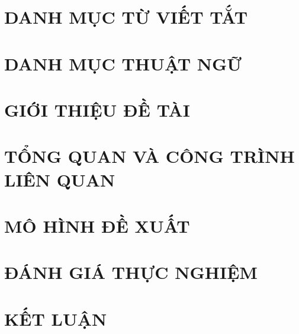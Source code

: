 \documentclass[a4paper,twoside]{report}
\theoremstyle{definition}
\numberwithin{equation}{chapter}
\begin{document}
\newpage
{}
{}
\chapter*{DANH MỤC TỪ VIẾT TẮT}


\newpage
{}
{}
\chapter*{DANH MỤC THUẬT NGỮ}



\newpage
{}

\pagestyle{fancy}
\fancyhf{}
\fancyhead[RE, LO]{\leftmark}
\fancyfoot[RE, LO]{\thepage}

\chapter{GIỚI THIỆU ĐỀ TÀI}
\label{chapter:Introduction}

\newpage    
\chapter{TỔNG QUAN VÀ CÔNG TRÌNH LIÊN QUAN}
\label{chapter:Related_works}



\newpage
\chapter{MÔ HÌNH ĐỀ XUẤT}
\label{chapter:Methodology}


\newpage
\chapter{ĐÁNH GIÁ THỰC NGHIỆM}
\label{chapter:Experiment}


\newpage
\chapter{KẾT LUẬN} %
\label{chapter:conclusion}

\end{document}
